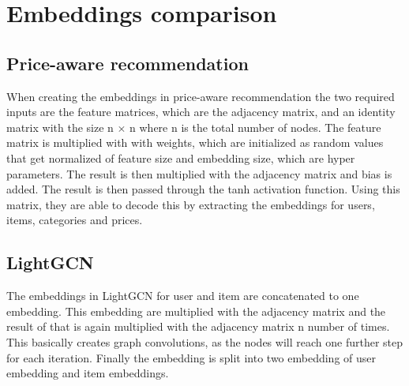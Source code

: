 \section{Embeddings comparison}
\subsection{Price-aware recommendation}
When creating the embeddings in price-aware recommendation the two required inputs are the feature matrices, which are the adjacency matrix, and an identity matrix with the size n  $\times$ n where n is the total number of nodes.
The feature matrix is multiplied with with weights, which are initialized as random values that get normalized of feature size and embedding size, which are hyper parameters.
The result is then multiplied with the adjacency matrix and bias is added.
The result is then passed through the tanh activation function.
Using this matrix, they are able to decode this by extracting the embeddings for users, items, categories and prices.

\subsection{LightGCN}
The embeddings in LightGCN for user and item are concatenated to one embedding.
This embedding are multiplied with the adjacency matrix and the result of that is again multiplied with the adjacency matrix n number of times.
This basically creates graph convolutions, as the nodes will reach one further step for each iteration.
Finally the embedding is split into two embedding of user embedding and item embeddings.
